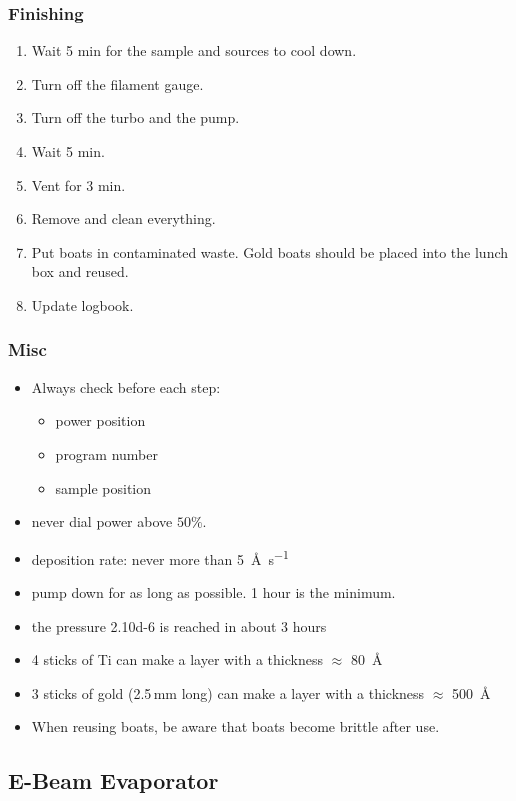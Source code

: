 \subsubsection{Finishing}
\begin{enumerate}[resume]
\item Wait 5 min for the sample and sources to cool down.
\item Turn off the filament gauge.
\item Turn off the turbo and the pump.
\item Wait 5 min.
\item Vent for 3 min.
\item Remove and clean everything.
\item Put boats in contaminated waste. Gold boats should be placed into the lunch box and reused.
\item Update logbook.
\end{enumerate}

\subsubsection{Misc}
\begin{itemize}
\item Always check before each step:
\begin{itemize}[noitemsep,nolistsep]
  \item power position
  \item program number
  \item sample position
\end{itemize}
\item never dial power above $50\%$.
\item deposition rate: never more than \SI{5}{\angstrom\per\second}
\item pump down for as long as possible. 1 hour is the minimum.
\item the pressure \SI{2.10d-6}{\torr} is reached in about 3 hours
\item 4 sticks of Ti can make a layer with a thickness $\approx$ \SI{80}{\angstrom}
\item 3 sticks of gold (2.5\,mm long) can make a layer with a thickness $\approx$ \SI{500}{\angstrom}
\item When reusing boats, be aware that boats become brittle after use.
\end{itemize}

\newpage

\subsection{E-Beam Evaporator}
